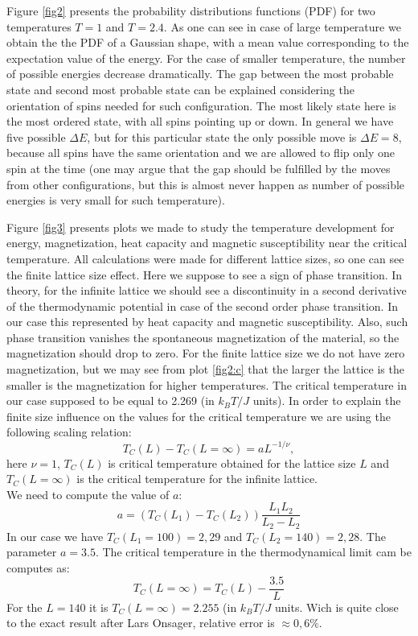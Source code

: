 \documentclass[a4paper]{article}
\begin{document}
Figure \ref{fig2} presents the probability distributions functions (PDF) for two temperatures $T=1$ and $T=2.4$. As one can see in case of large temperature we obtain the the PDF of a Gaussian shape, with a mean value corresponding to the expectation value of the energy. For the case of smaller temperature, the number of possible energies decrease dramatically. The gap between the most probable state and second most probable state can be explained considering the orientation of spins needed for such configuration. The most likely state here is the most ordered state, with all spins pointing up or down. In general we have five possible $\Delta E$, but for this particular state the only possible move is $\Delta E =8$, because all spins have the same orientation and we are allowed to flip only one spin at the time (one may argue that the gap should be fulfilled by the moves from other configurations, but this is almost never happen as number of possible energies is very small for such temperature).

Figure \ref{fig3} presents plots we made to study the temperature development for energy, magnetization, heat capacity and magnetic susceptibility near the critical temperature. All calculations were made for different lattice sizes, so one can see the finite lattice size effect. Here we suppose to see a sign of phase transition. In theory, for the infinite lattice we should see a discontinuity in a second derivative of the thermodynamic potential in case of the second order phase transition. In our case this represented by heat capacity and magnetic susceptibility. Also, such phase transition vanishes the spontaneous magnetization of the material, so the magnetization should drop to zero.  For the finite lattice size we do not have zero magnetization, but we may see from plot \ref{fig2:c} that the larger the lattice is the smaller is the magnetization for higher temperatures. The critical temperature in our case supposed to be equal to 2.269 (in $k_BT/J$ units). 
In order to explain the finite size influence on the values for the critical temperature we are using the following scaling relation:
\begin{equation}
 T_C(L)-T_C(L=\infty) = aL^{-1/\nu},
 \label{eq:tc}
\end{equation}
here $\nu =1$, $T_C(L)$ is critical temperature obtained for the lattice size $L$ and $T_C(L=\infty)$ is the critical temperature for the infinite lattice. \\
We need to compute the value of $a$:
\begin{equation}
a=(T_C(L_1)-T_C(L_2))\frac{L_1 L_2}{L_2-L_2}
\end{equation}
In our case we have $T_C(L_1 =100)=2,29$ and $T_C(L_2 =140)=2,28$. The parameter $a=3.5$. The critical temperature in the thermodynamical limit cam be computes as:
\begin{equation}
T_C(L=\infty) = T_C(L)-\frac{3.5}{L}
\end{equation}
For the $L=140$ it is $T_C(L=\infty)= 2.255$ (in $k_BT/J$ units. Wich is quite close to the exact result after Lars Onsager, relative error is $\approx 0,6\%$.
\end{document}
